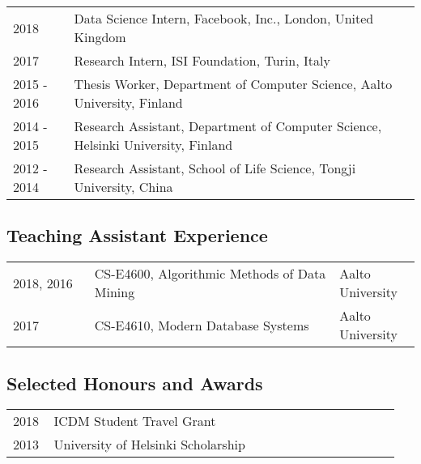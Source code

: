 \documentclass[12pt,]{scrartcl}
\begin{document}
\begin{table}[h]
{\def\arraystretch{1.5}\tabcolsep=0pt
\begin{tabular}{p{0.15\linewidth}p{0.85\linewidth}}

  2018 & Data Science Intern, Facebook, Inc., London, United Kingdom \\
  
  2017 & Research Intern, ISI Foundation, Turin, Italy \\
  
  2015 - 2016 & Thesis Worker, Department of Computer Science, Aalto University, Finland \\
  
  2014 - 2015 & Research Assistant, Department of Computer Science, Helsinki University, Finland \\

  2012 - 2014 & Research Assistant, School of Life Science, Tongji University, China \\
\end{tabular}%
}
\end{table}

\subsection{Teaching Assistant Experience}\label{teaching}

\begin{table}[!h]
{\def\arraystretch{1.5}\tabcolsep=0pt
\begin{tabular}{p{0.20\linewidth}p{0.6\linewidth}p{0.2\linewidth}}

  2018, 2016 & CS-E4600, Algorithmic Methods of Data Mining & Aalto University \\
  
  2017 & CS-E4610, Modern Database Systems & Aalto University  \\

  
\end{tabular}%
}
\end{table}

\newpage


\subsection{Selected Honours and
Awards}\label{selected-honours-and-awards}

\begin{table}[!h]
{\def\arraystretch{1.5}\tabcolsep=0pt
\begin{tabular}{p{0.10\linewidth}p{0.85\linewidth}}

  2018 & ICDM Student Travel Grant \\
  
  2013 & University of Helsinki Scholarship \\

\end{tabular}%
}
\end{table}
\end{document}
